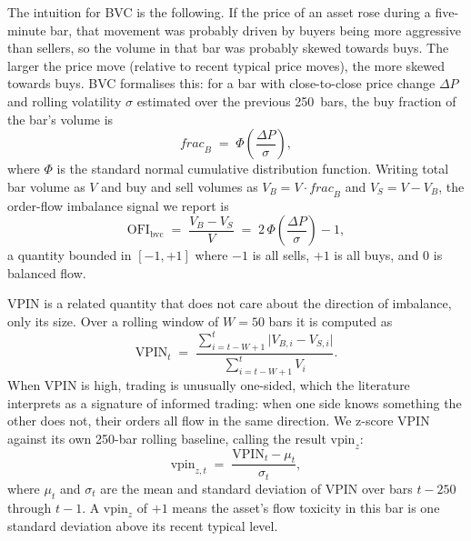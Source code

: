 \documentclass[11pt,a4paper]{article}
\newcommand{\OFI}{\mathrm{OFI}_{\mathrm{bvc}}}
\newcommand{\vpinz}{\mathrm{vpin}_{z}}
\newcommand{\Ncdf}{\Phi}
\begin{document}
The intuition for BVC is the following. If the price of an asset rose during a five-minute bar, that movement was probably driven by buyers being more aggressive than sellers, so the volume in that bar was probably skewed towards buys. The larger the price move (relative to recent typical price moves), the more skewed towards buys. BVC formalises this: for a bar with close-to-close price change $\Delta P$ and rolling volatility $\sigma$ estimated over the previous 250~bars, the buy fraction of the bar's volume is
\begin{equation}
\mathit{frac}_B \;=\; \Ncdf\!\left(\frac{\Delta P}{\sigma}\right),
\label{eq:bvc-frac}
\end{equation}
where $\Ncdf$ is the standard normal cumulative distribution function. Writing total bar volume as $V$ and buy and sell volumes as $V_B = V \cdot \mathit{frac}_B$ and $V_S = V - V_B$, the order-flow imbalance signal we report is
\begin{equation}
\OFI \;=\; \frac{V_B - V_S}{V} \;=\; 2\,\Ncdf\!\left(\frac{\Delta P}{\sigma}\right) - 1,
\label{eq:ofi-bvc}
\end{equation}
a quantity bounded in $[-1, +1]$ where $-1$ is all sells, $+1$ is all buys, and $0$ is balanced flow.

VPIN is a related quantity that does not care about the direction of imbalance, only its size. Over a rolling window of $W = 50$ bars it is computed as
\begin{equation}
\mathrm{VPIN}_t \;=\; \frac{\sum_{i=t-W+1}^{t} \lvert V_{B,i} - V_{S,i} \rvert}{\sum_{i=t-W+1}^{t} V_i}.
\label{eq:vpin}
\end{equation}
When VPIN is high, trading is unusually one-sided, which the literature interprets as a signature of informed trading: when one side knows something the other does not, their orders all flow in the same direction. We z-score VPIN against its own 250-bar rolling baseline, calling the result $\vpinz$:
\begin{equation}
\mathrm{vpin}_{z,t} \;=\; \frac{\mathrm{VPIN}_t - \mu_{t}}{\sigma_{t}},
\label{eq:vpinz}
\end{equation}
where $\mu_t$ and $\sigma_t$ are the mean and standard deviation of $\mathrm{VPIN}$ over bars $t-250$ through $t-1$. A $\vpinz$ of $+1$ means the asset's flow toxicity in this bar is one standard deviation above its recent typical level.
\end{document}
